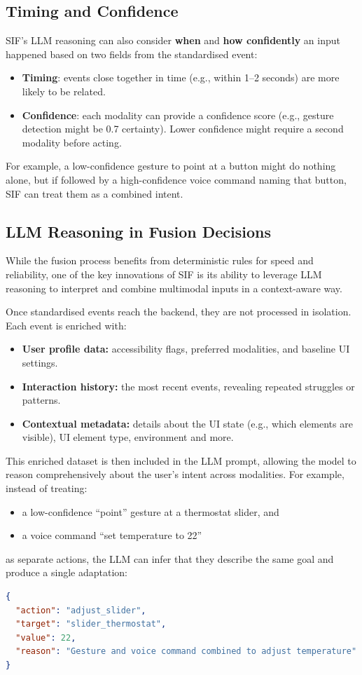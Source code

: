 \documentclass[openany]{book}
\begin{document}
\subsection{Timing and Confidence}
SIF's LLM reasoning can also consider \textbf{when} and \textbf{how confidently} an input happened based on two fields from the standardised event:
\begin{itemize}
    \item \textbf{Timing}: events close together in time (e.g., within 1–2 seconds) are more likely to be related.
    \item \textbf{Confidence}: each modality can provide a confidence score (e.g., gesture detection might be 0.7 certainty). Lower confidence might require a second modality before acting.
\end{itemize}
For example, a low-confidence gesture to point at a button might do nothing alone, but if followed by a high-confidence voice command naming that button, SIF can treat them as a combined intent.

\subsection{LLM Reasoning in Fusion Decisions}
While the fusion process benefits from deterministic rules for speed and reliability, one of the key innovations of SIF is its ability to leverage LLM reasoning to interpret and combine multimodal inputs in a context-aware way. 

Once standardised events reach the backend, they are not processed in isolation. Each event is enriched with:
\begin{itemize}
    \item \textbf{User profile data:} accessibility flags, preferred modalities, and baseline UI settings.
    \item \textbf{Interaction history:} the most recent events, revealing repeated struggles or patterns.
    \item \textbf{Contextual metadata:} details about the UI state (e.g., which elements are visible), UI element type, environment and more.
\end{itemize}

This enriched dataset is then included in the LLM prompt, allowing the model to reason comprehensively about the user’s intent across modalities.  
For example, instead of treating:
\begin{itemize}
    \item a low-confidence “point” gesture at a thermostat slider, and
    \item a voice command “set temperature to 22”
\end{itemize}
as separate actions, the LLM can infer that they describe the same goal and produce a single adaptation: 
\begin{lstlisting}[language=json]
{
  "action": "adjust_slider",
  "target": "slider_thermostat",
  "value": 22,
  "reason": "Gesture and voice command combined to adjust temperature"
}
\end{lstlisting}
\end{document}
